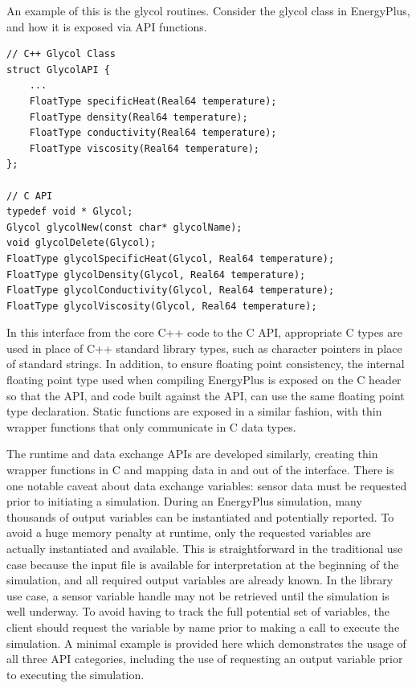 \documentclass[5p, authoryear]{elsarticle}
\begin{document}
An example of this is the glycol routines.  Consider the glycol class in EnergyPlus, and how it is exposed via API functions.

\lstset{language=c}
\begin{lstlisting}
// C++ Glycol Class
struct GlycolAPI {
    ...
    FloatType specificHeat(Real64 temperature);
    FloatType density(Real64 temperature);
    FloatType conductivity(Real64 temperature);
    FloatType viscosity(Real64 temperature);
};

// C API
typedef void * Glycol;
Glycol glycolNew(const char* glycolName);
void glycolDelete(Glycol);
FloatType glycolSpecificHeat(Glycol, Real64 temperature);
FloatType glycolDensity(Glycol, Real64 temperature);
FloatType glycolConductivity(Glycol, Real64 temperature);
FloatType glycolViscosity(Glycol, Real64 temperature);
\end{lstlisting}

In this interface from the core C++ code to the C API, appropriate C types are used in place of C++ standard library types, such as character pointers in place of standard strings.  In addition, to ensure floating point consistency, the internal floating point type used when compiling EnergyPlus is exposed on the C header so that the API, and code built against the API, can use the same floating point type declaration.  Static functions are exposed in a similar fashion, with thin wrapper functions that only communicate in C data types.

The runtime and data exchange APIs are developed similarly, creating thin wrapper functions in C and mapping data in and out of the interface.  There is one notable caveat about data exchange variables: sensor data must be requested prior to initiating a simulation.  During an EnergyPlus simulation, many thousands of output variables can be instantiated and potentially reported.  To avoid a huge memory penalty at runtime, only the requested variables are actually instantiated and available.  This is straightforward in the traditional use case because the input file is available for interpretation at the beginning of the simulation, and all required output variables are already known.  In the library use case, a sensor variable handle may not be retrieved until the simulation is well underway.  To avoid having to track the full potential set of variables, the client should request the variable by name prior to making a call to execute the simulation.  A minimal example is provided here which demonstrates the usage of all three API categories, including the use of requesting an output variable prior to executing the simulation.  
\end{document}
